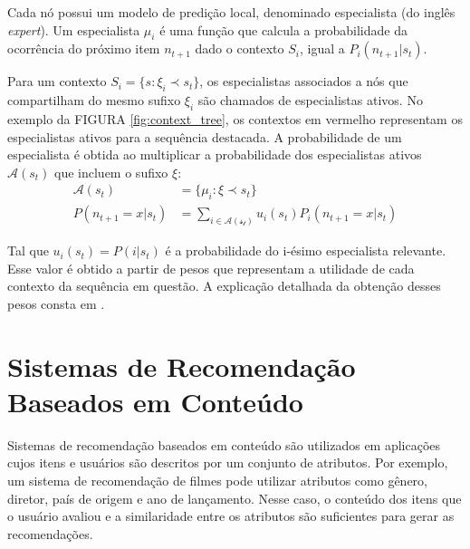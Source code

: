 Cada nó possui um modelo de predição local, denominado especialista (do inglês
\textit{expert}). Um especialista $\mu_i$ é uma função que calcula a
probabilidade da ocorrência do próximo item $n_{t+1}$ dado o contexto $S_i$, igual a
$P_i(n_{t+1} | s_t)$.

Para um contexto $S_i = \{s: \xi_i \prec s_t\}$, os especialistas associados a
nós que compartilham do mesmo sufixo $\xi_i$ são chamados de especialistas
ativos. No exemplo da FIGURA \ref{fig:context_tree}, os contextos em vermelho
representam os especialistas ativos para a sequência destacada. A probabilidade de um especialista é obtida ao multiplicar a probabilidade dos
especialistas ativos $\mathcal{A}(s_t)$
 que incluem o sufixo $\xi$:
\begin{align}
    \mathcal{A}(s_t) &= \{\mu_i : \xi \prec s_t\}\\
    P(n_{t+1} = x | s_t) &= \sum_{i \in \mathcal{A(s_t)}} u_i(s_t)  P_i(n_{t+1} = x | s_t)
\end{align}

Tal que $u_i (s_t) = P(i|s_t)$ é a probabilidade do i-ésimo especialista
relevante. Esse valor é obtido a partir de pesos que representam a utilidade de
cada contexto da sequência em questão. A explicação detalhada da obtenção
desses pesos consta em \citet{mi2018context}.















\section{Sistemas de Recomendação Baseados em Conteúdo}

Sistemas de recomendação baseados em conteúdo são utilizados em aplicações cujos
itens e usuários são descritos por um conjunto de atributos. Por exemplo, um
sistema de recomendação de filmes pode utilizar atributos como gênero, diretor,
país de origem e ano de lançamento. Nesse caso, o conteúdo dos itens que o
usuário avaliou e a similaridade entre os atributos são
suficientes para gerar as recomendações.

